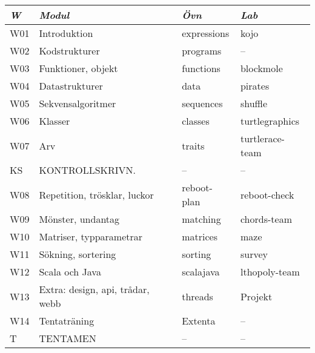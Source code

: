 \begin{tabular}{l|l|l|l}
\textit{W} & \textit{Modul} & \textit{Övn} & \textit{Lab} \\ \hline \hline
W01 & Introduktion & expressions & kojo \\
W02 & Kodstrukturer & programs & -- \\
W03 & Funktioner, objekt & functions & blockmole \\
W04 & Datastrukturer & data & pirates \\
W05 & Sekvensalgoritmer & sequences & shuffle \\
W06 & Klasser & classes & turtlegraphics \\
W07 & Arv & traits & turtlerace-team \\
KS & KONTROLLSKRIVN. & -- & -- \\
W08 & Repetition, trösklar, luckor & reboot-plan & reboot-check \\
W09 & Mönster, undantag & matching & chords-team \\
W10 & Matriser, typparametrar & matrices & maze \\
W11 & Sökning, sortering & sorting & survey \\
W12 & Scala och Java & scalajava & lthopoly-team \\
W13 & Extra: design, api, trådar, webb & threads & Projekt \\
W14 & Tentaträning & Extenta & -- \\
T & TENTAMEN & -- & -- \\
\end{tabular}
